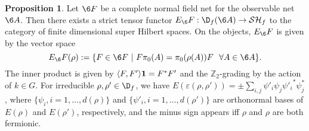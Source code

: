 \documentclass[11pt]{article}
\theoremstyle{definition}
\newtheorem{prop}[thm]{Proposition}
\theoremstyle{definition}
\theoremstyle{remark}
\newcommand{\ve}{\varepsilon}
\def\2#1{{\mathcal #1}}
\def\7#1{{\mathbb #1}}
\def\1#1{{\bf #1}}
\newcommand{\rarr}{\rightarrow}
\begin{document}
\begin{prop}  \label{prop-FtoE}
Let $\6F$ be a complete normal field net for the observable net $\6A$. Then there exists a strict
tensor functor $E_\6F:\D_f(\6A)\rarr\2S\2H_f$ to the category of finite dimensional super Hilbert
spaces. On the objects, $E_\6F$ is given by the vector space 
\[ E_\6F(\rho):=\{ F\in\6F\ | \ F\pi_0(A)=\pi_0(\rho(A))F \ \ \forall A\in\6A\}. \]
The inner product is given by $\langle F,F'\rangle\11=F^*F'$ and the $\7Z_2$-grading by the action
of $k\in G$. For irreducible $\rho,\rho'\in\D_f$,
we have $E(\ve(\rho,\rho'))=\pm \sum_{i,j}\psi'_i\psi_j{\psi'_i}^*\psi_j^*$,
where  $\{\psi_i, i=1,\ldots,d(\rho)\}$ and $\{\psi'_i, i=1,\ldots,d(\rho')\}$ are orthonormal
bases of $E(\rho)$ and $E(\rho')$, respectively, and the minus sign appears iff $\rho$ and $\rho$
are both fermionic. 
\end{prop}
\end{document}
